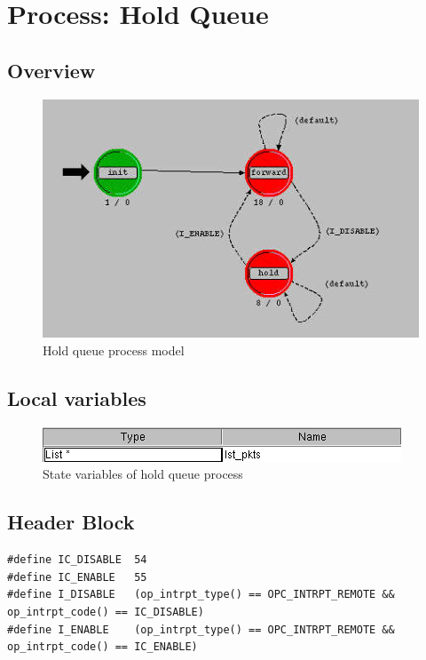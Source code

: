 
\section{Process: Hold Queue}

\subsection{Overview}
\begin{figure}[ht]
    \centering
    \includegraphics[width=.7\textwidth]{images/hold_queue}
    \caption{Hold queue process model}
    \label{fig:appendix-e}
\end{figure}

\subsection{Local variables}
\begin{figure}[ht]
    \centering
    \includegraphics[width=.7\textwidth]{images/state_variable_hold_queue}
    \caption{State variables of hold queue process}
    \label{fig:appendix-e_sv}
\end{figure}

\subsection{Header Block}
{\tiny
\begin{verbatim}
#define IC_DISABLE	54
#define IC_ENABLE	55
#define I_DISABLE	(op_intrpt_type() == OPC_INTRPT_REMOTE && op_intrpt_code() == IC_DISABLE)
#define I_ENABLE	(op_intrpt_type() == OPC_INTRPT_REMOTE && op_intrpt_code() == IC_ENABLE)

\end{verbatim}
}

